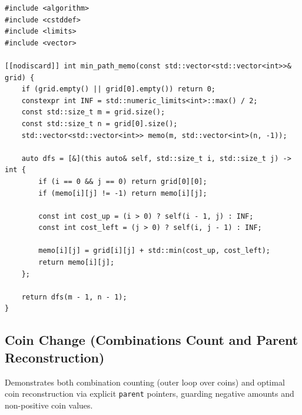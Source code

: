 \documentclass[11pt,a4paper]{article}
\theoremstyle{definition}
\begin{document}
\begin{lstlisting}[caption={Top-down grid memoization using a C++23 recursive lambda}]
#include <algorithm>
#include <cstddef>
#include <limits>
#include <vector>

[[nodiscard]] int min_path_memo(const std::vector<std::vector<int>>& grid) {
    if (grid.empty() || grid[0].empty()) return 0;
    constexpr int INF = std::numeric_limits<int>::max() / 2;
    const std::size_t m = grid.size();
    const std::size_t n = grid[0].size();
    std::vector<std::vector<int>> memo(m, std::vector<int>(n, -1));

    auto dfs = [&](this auto& self, std::size_t i, std::size_t j) -> int {
        if (i == 0 && j == 0) return grid[0][0];
        if (memo[i][j] != -1) return memo[i][j];

        const int cost_up = (i > 0) ? self(i - 1, j) : INF;
        const int cost_left = (j > 0) ? self(i, j - 1) : INF;

        memo[i][j] = grid[i][j] + std::min(cost_up, cost_left);
        return memo[i][j];
    };

    return dfs(m - 1, n - 1);
}
\end{lstlisting}

\subsection{Coin Change (Combinations Count and Parent Reconstruction)}
Demonstrates both combination counting (outer loop over coins) and optimal coin reconstruction via explicit \texttt{parent} pointers, guarding negative amounts and non-positive coin values.
\end{document}
